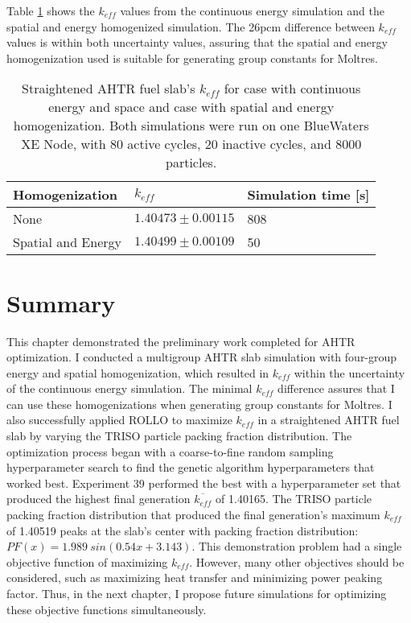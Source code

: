 Table \ref{tab:keff_multigroup} shows the $k_{eff}$ values from the continuous 
energy simulation and the spatial and energy homogenized simulation. 
The 26pcm difference between $k_{eff}$ values is within both uncertainty values, 
assuring that the spatial and energy homogenization used is suitable for generating 
group constants for Moltres. 
\begin{table}[]
    \centering
    \onehalfspacing
    \caption{Straightened \acrfull{AHTR} fuel slab's $k_{eff}$ for case with 
    continuous energy and space and case with spatial and energy homogenization. 
    Both simulations were run on one BlueWaters XE Node, with 80 active cycles, 
    20 inactive cycles, and 8000 particles.}
	\label{tab:keff_multigroup}
    \footnotesize
    \begin{tabular}{lll}
    \hline 
    \textbf{Homogenization}& \textbf{$k_{eff}$} & \textbf{Simulation time [s]}  \\
    \hline 
    None & $1.40473 \pm 0.00115$ & 808\\ 
    Spatial and Energy & $1.40499 \pm 0.00109$ & 50\\ 
    \hline
    \end{tabular}
\end{table}

\section{Summary}
This chapter demonstrated the preliminary work completed for \gls{AHTR} 
optimization. 
I conducted a multigroup \gls{AHTR} slab simulation with four-group energy 
and spatial homogenization, which resulted in $k_{eff}$ within the uncertainty of 
the continuous energy simulation. 
The minimal $k_{eff}$ difference assures that I can use these homogenizations 
when generating group constants for Moltres. 
I also successfully applied \gls{ROLLO} to maximize $k_{eff}$ in a straightened 
\acrfull{AHTR} fuel slab by varying the \gls{TRISO} particle packing fraction 
distribution. 
The optimization process began with a coarse-to-fine random sampling 
hyperparameter search to find the genetic algorithm hyperparameters that worked 
best. 
Experiment 39 performed the best with a hyperparameter set that produced the 
highest final generation $\overline{k_{eff}}$ of 1.40165. 
The \gls{TRISO} particle packing fraction distribution that produced the final 
generation's maximum $k_{eff}$ of 1.40519 peaks at the slab's center with 
packing fraction distribution: $PF(x)=1.989\ sin(0.54x+3.143)$. 
This demonstration problem had a single objective function of maximizing
$k_{eff}$. 
However, many other objectives should be considered, such as maximizing heat 
transfer and minimizing power peaking factor.
Thus, in the next chapter, I propose future simulations for optimizing
these objective functions simultaneously.

